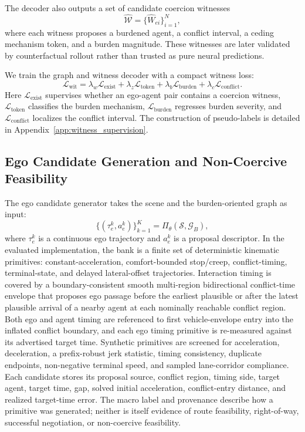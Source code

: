 \documentclass[10pt]{article}
\begin{document}
The decoder also outputs a set of candidate coercion witnesses
\begin{equation}
    \widehat{\mathcal{W}} =
    \{ \widehat{W}_{ei} \}_{i=1}^{N},
\end{equation}
where each witness proposes a burdened agent, a conflict interval, a ceding mechanism token, and a burden magnitude. These witnesses are later validated by counterfactual rollout rather than trusted as pure neural predictions.

We train the graph and witness decoder with a compact witness loss:
\begin{equation}
    \mathcal{L}_{\mathrm{wit}}
    =
    \lambda_w \mathcal{L}_{\mathrm{exist}}
    +
    \lambda_z \mathcal{L}_{\mathrm{token}}
    +
    \lambda_b \mathcal{L}_{\mathrm{burden}}
    +
    \lambda_c \mathcal{L}_{\mathrm{conflict}} .
\end{equation}
Here $\mathcal{L}_{\mathrm{exist}}$ supervises whether an ego-agent pair contains a coercion witness, $\mathcal{L}_{\mathrm{token}}$ classifies the burden mechanism, $\mathcal{L}_{\mathrm{burden}}$ regresses burden severity, and $\mathcal{L}_{\mathrm{conflict}}$ localizes the conflict interval. The construction of pseudo-labels is detailed in Appendix~\ref{app:witness_supervision}.

\subsection{Ego Candidate Generation and Non-Coercive Feasibility}
\label{sec:method_candidate}

The ego candidate generator takes the scene and the burden-oriented graph as input:
\begin{equation}
    \{(\tau^k_e, a^k_e)\}_{k=1}^{K}
    =
    \Pi_{\theta}(\mathcal{S}, \mathcal{G}_B),
\end{equation}
where $\tau^k_e$ is a continuous ego trajectory and $a^k_e$ is a proposal descriptor. In the evaluated implementation, the bank is a finite set of deterministic kinematic primitives: constant-acceleration, comfort-bounded stop/creep, conflict-timing, terminal-state, and delayed lateral-offset trajectories. Interaction timing is covered by a boundary-consistent smooth multi-region bidirectional conflict-time envelope that proposes ego passage before the earliest plausible or after the latest plausible arrival of a nearby agent at each nominally reachable conflict region. Both ego and agent timing are referenced to first vehicle-envelope entry into the inflated conflict boundary, and each ego timing primitive is re-measured against its advertised target time. Synthetic primitives are screened for acceleration, deceleration, a prefix-robust jerk statistic, timing consistency, duplicate endpoints, non-negative terminal speed, and sampled lane-corridor compliance. Each candidate stores its proposal source, conflict region, timing side, target agent, target time, gap, solved initial acceleration, conflict-entry distance, and realized target-time error. The macro label and provenance describe how a primitive was generated; neither is itself evidence of route feasibility, right-of-way, successful negotiation, or non-coercive feasibility.
\end{document}

